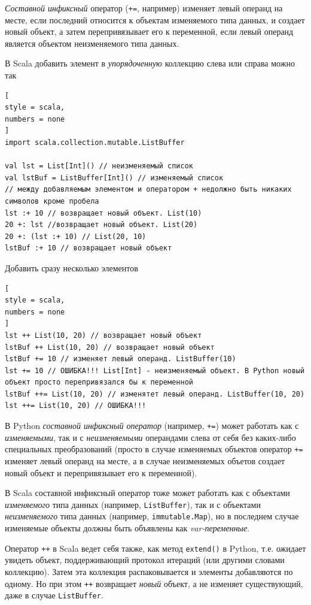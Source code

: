 \documentclass[%
	11pt,
	a4paper,
	utf8,
		]{article}
\begin{document}
\emph{Составной инфиксный} оператор (\texttt{+=}, например) изменяет левый операнд на месте, если последний относится к объектам изменяемого типа данных, и создает новый объект, а затем перепривязывает его к переменной, если левый операнд является объектом неизменяемого типа данных.

В Scala добавить элемент в \emph{упорядоченную} коллекцию слева или справа можно так
\begin{lstlisting}[
style = scala,
numbers = none	
]
import scala.collection.mutable.ListBuffer

val lst = List[Int]() // неизменяемый список
val lstBuf = ListBuffer[Int]() // изменяемый список
// между добавляемым элементом и оператором + недолжно быть никаких символов кроме пробела
lst :+ 10 // возвращает новый объект. List(10)
20 +: lst //возвращает новый объект. List(20)
20 +: (lst :+ 10) // List(20, 10)
lstBuf :+ 10 // возвращает новый объект
\end{lstlisting}

Добавить сразу несколько элементов
\begin{lstlisting}[
style = scala,
numbers = none	
]
lst ++ List(10, 20) // возвращает новый объект
lstBuf ++ List(10, 20) // возвращает новый объект
lstBuf += 10 // изменяет левый операнд. ListBuffer(10)
lst += 10 // ОШИБКА!!! List[Int] - неизменяемый объект. В Python новый объект просто перепривязался бы к переменной
lstBuf ++= List(10, 20) // изменятет левый операнд. ListBuffer(10, 20)
lst ++= List(10, 20) // ОШИБКА!!!
\end{lstlisting}

В Python \emph{составной инфиксный оператор} (например, \texttt{+=}) может работать как с \emph{изменяемыми}, так и с \emph{неизменяемыми} операндами слева от себя без каких-либо специальных преобразований (просто в случае изменяемых объектов оператор \texttt{+=} изменяет левый операнд на месте, а в случае неизменяемых объетов создает новый объект и перепривязывает его к переменной).

В Scala составной инфиксный оператор тоже может работать как с объектами \emph{изменяемого} типа данных (например, \texttt{ListBuffer}), так и с объектами \emph{неизменяемого} типа данных (например, \texttt{immutable.Map}), но в последнем случае изменяемые объекты должны быть объявлены как \emph{var-переменные}.

Оператор \texttt{++} в Scala ведет себя также, как метод \texttt{extend()} в Python, т.е. ожидает увидеть объект, поддерживающий протокол итераций (или другими словами коллекцию). Затем эта коллекция распаковывается и элементы добавляются по одному. Но при этом \texttt{++} возвращает \emph{новый} объект, а не изменяет существующий, даже в случае \texttt{ListBuffer}.
\end{document}
